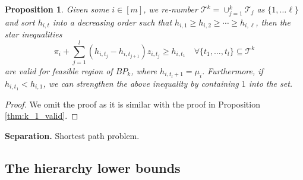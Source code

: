 \documentclass[11pt]{article}
\newtheorem{proposition}{Proposition}
\newcommand{\RR}{\mathbb{R}}
\newcommand{\T}{\mathcal{T}}
\newcommand{\Pp}{\mathcal{P}}
\begin{document}
\begin{proposition}
	Given some $i\in [m]$, we re-number $\T^k = \cup_{j=1}^k \T_j$ as  $\{1, \ldots \ell\}$ and sort $h_{i, t}$ into a decreasing order such that $h_{i,1} \geq h_{i,2} \geq \cdots \geq h_{i,\ell}$, then the star inequalities 
	\[ \pi_i +  \sum_{j=1}^{l} (h_{i, t_j} - h_{i, t_{j+1}}) z_{i,t_j} \geq h_{i, t_1} \quad \forall \{t_1, \ldots, t_l\} \subseteq \T^k \]
	are valid for feasible region of $BP_k$, where $h_{i,t_l+1} = \mu_i.$ Furthermore, if $h_{i, t_1} < h_{i, 1}$, we can strengthen the above inequality by containing $1$ into the set.
	
\end{proposition}
\begin{proof}
	We omit the proof as it is similar with the proof in Proposition \ref{thm:k_1_valid}.
\end{proof}

\textbf{Separation.} Shortest path problem.
%
%

\subsection{The hierarchy lower bounds}
\end{document}
